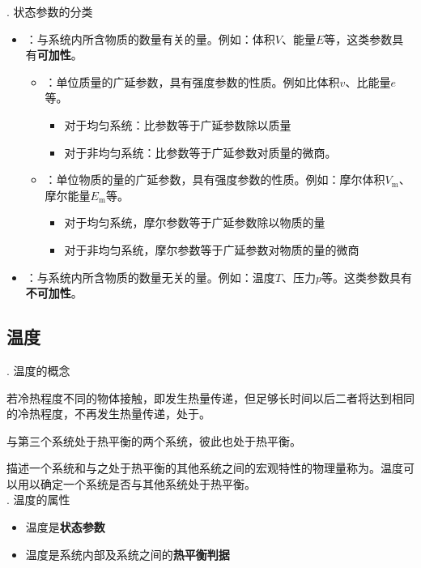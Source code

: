 . 状态参数的分类
\begin{itemize}
	\item {}：与系统内所含物质的数量有关的量。例如：体积$V$、能量$E$等，这类参数具有\textbf{可加性}。
	\begin{itemize}
		\item {}：单位质量的广延参数，具有强度参数的性质。例如比体积$v$、比能量$e$等。
		\begin{itemize}
			\item 对于均匀系统：比参数等于广延参数除以质量
			\item 对于非均匀系统：比参数等于广延参数对质量的微商。
		\end{itemize}
		\item {}：单位物质的量的广延参数，具有强度参数的性质。例如：摩尔体积$V_\text{m}$、摩尔能量$E_\text{m}$等。
		\begin{itemize}
			\item 对于均匀系统，摩尔参数等于广延参数除以物质的量
			\item 对于非均匀系统，摩尔参数等于广延参数对物质的量的微商
		\end{itemize}
	\end{itemize}
	\item {}：与系统内所含物质的数量无关的量。例如：温度$T$、压力$p$等。这类参数具有\textbf{不可加性}。
\end{itemize}

\subsection{温度}
. 温度的概念

若冷热程度不同的物体接触，即发生热量传递，但足够长时间以后二者将达到相同的冷热程度，不再发生热量传递，处于。

\theorem[热力学第零定律]
与第三个系统处于热平衡的两个系统，彼此也处于热平衡。

描述一个系统和与之处于热平衡的其他系统之间的宏观特性的物理量称为。温度可以用以确定一个系统是否与其他系统处于热平衡。\\

. 温度的属性
\begin{itemize}
	\item 温度是\textbf{状态参数}
	\item 温度是系统内部及系统之间的\textbf{热平衡判据}
\end{itemize}

